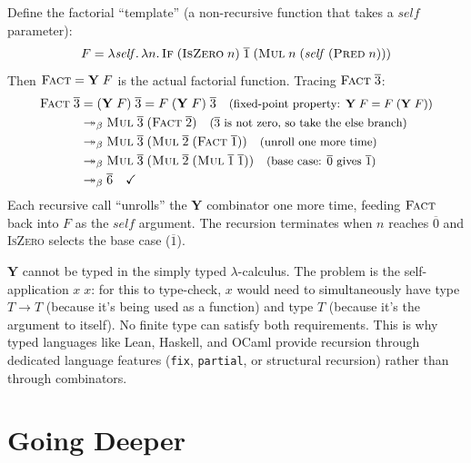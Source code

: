 \documentclass[11pt,a4paper]{article}
\theoremstyle{definition}
\newcommand{\lam}{\lambda}
\newcommand{\reduces}{\twoheadrightarrow_\beta}
\newcommand{\church}[1]{\overline{#1}}
\newcommand{\rmark}[1]{\quad\text{\small(#1)}}
\begin{document}
\begin{workedexample}
Define the factorial ``template'' (a non-recursive function that takes a
$\mathit{self}$ parameter):
\[
F = \lam \mathit{self}.\, \lam n.\,
\textsc{If}\;(\textsc{IsZero}\;n)\;\church{1}\;(\textsc{Mul}\;n\;(\mathit{self}\;(\textsc{Pred}\;n)))
\]
Then $\textsc{Fact} = \mathbf{Y}\;F$ is the actual factorial function. Tracing
$\textsc{Fact}\;\church{3}$:
\begin{align*}
\textsc{Fact}\;\church{3}
  &= (\mathbf{Y}\;F)\;\church{3}
   = F\;(\mathbf{Y}\;F)\;\church{3}
    \rmark{fixed-point property: $\mathbf{Y}\;F = F\;(\mathbf{Y}\;F)$} \\
  &\reduces \textsc{Mul}\;\church{3}\;(\textsc{Fact}\;\church{2})
    \rmark{$\church{3}$ is not zero, so take the else branch} \\
  &\reduces \textsc{Mul}\;\church{3}\;(\textsc{Mul}\;\church{2}\;(\textsc{Fact}\;\church{1}))
    \rmark{unroll one more time} \\
  &\reduces \textsc{Mul}\;\church{3}\;(\textsc{Mul}\;\church{2}\;(\textsc{Mul}\;\church{1}\;\church{1}))
    \rmark{base case: $\church{0}$ gives $\church{1}$} \\
  &\reduces \church{6} \quad\checkmark
\end{align*}
Each recursive call ``unrolls'' the $\mathbf{Y}$ combinator one more time,
feeding $\textsc{Fact}$ back into $F$ as the $\mathit{self}$ argument. The
recursion terminates when $n$ reaches $\church{0}$ and \textsc{IsZero} selects
the base case ($\church{1}$).
\end{workedexample}

\begin{warning}
$\mathbf{Y}$ cannot be typed in the simply typed $\lam$-calculus. The problem
is the self-application $x\;x$: for this to type-check, $x$ would need to
simultaneously have type $T \to T$ (because it's being used as a function) and
type $T$ (because it's the argument to itself). No finite type can satisfy
both requirements. This is why typed languages like Lean, Haskell, and OCaml
provide recursion through dedicated language features (\texttt{fix},
\texttt{partial}, or structural recursion) rather than through combinators.
\end{warning}

\part{Going Deeper}
\end{document}
